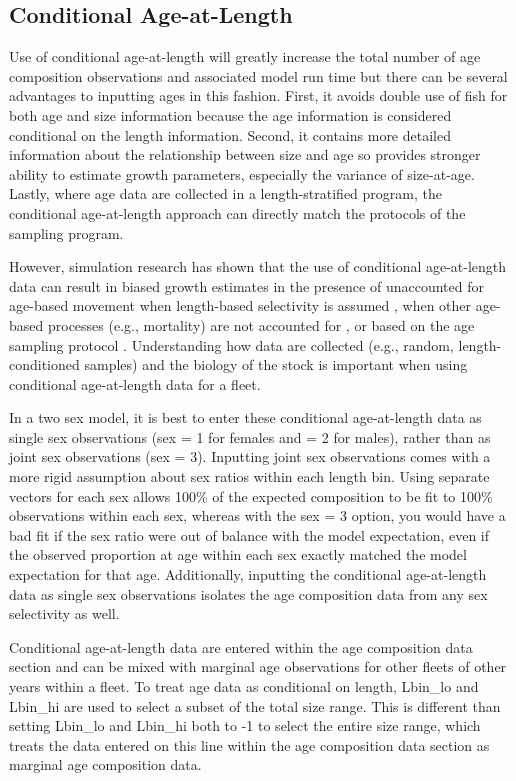 \subsection{Conditional Age-at-Length}
Use of conditional age-at-length will greatly increase the total number of age composition observations and associated model run time but there can be several advantages to inputting ages in this fashion.  First, it avoids double use of fish for both age and size information because the age information is considered conditional on the length information.  Second, it contains more detailed information about the relationship between size and age so provides stronger ability to estimate growth parameters, especially the variance of size-at-age. Lastly, where age data are collected in a length-stratified program, the conditional age-at-length approach can directly match the protocols of the sampling program.

However, simulation research has shown that the use of conditional age-at-length data can result in biased growth estimates in the presence of unaccounted for age-based movement when length-based selectivity is assumed \citep{lee-effects-2017}, when other age-based processes (e.g., mortality) are not accounted for \citep{lee-use-2019}, or based on the age sampling protocol \citep{piner-evaluation-2016}.  Understanding how data are collected (e.g., random, length-conditioned samples) and the biology of the stock is important when using conditional age-at-length data for a fleet.   

In a two sex model, it is best to enter these conditional age-at-length data as single sex observations (sex = 1 for females and = 2 for males), rather than as joint sex observations (sex = 3). Inputting joint sex observations comes with a more rigid assumption about sex ratios within each length bin. Using separate vectors for each sex allows 100\% of the expected composition to be fit to 100\% observations within each sex, whereas with the sex = 3 option, you would have a bad fit if the sex ratio were out of balance with the model expectation, even if the observed proportion at age within each sex exactly matched the model expectation for that age.  Additionally, inputting the conditional age-at-length data as single sex observations isolates the age composition data from any sex selectivity as well.

Conditional age-at-length data are entered within the age composition data section and can be mixed with marginal age observations for other fleets of other years within a fleet. To treat age data as conditional on length, Lbin\_lo and Lbin\_hi are used to select a subset of the total size range. This is different than setting Lbin\_lo and Lbin\_hi both to -1 to select the entire size 
range, which treats the data entered on this line within the age composition data section as marginal age
composition data. 


